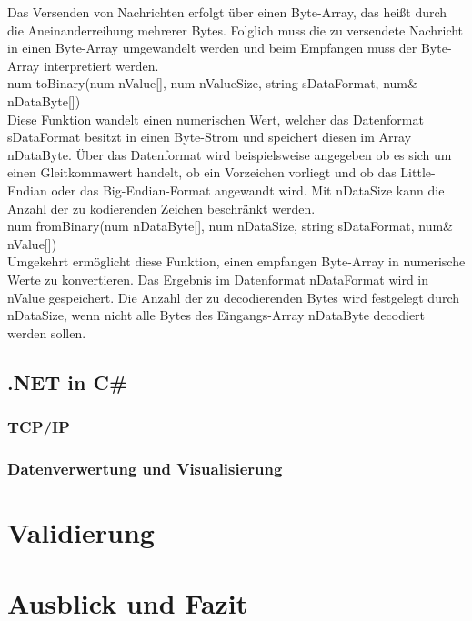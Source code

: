 \documentclass[ a4paper,
                oneside,
                toc=bibliography,
                toc=listof
                ]{scrbook}
\begin{document}
	Das Versenden von Nachrichten erfolgt über einen Byte-Array, das heißt durch die Aneinanderreihung mehrerer Bytes. Folglich muss die zu versendete Nachricht in einen Byte-Array umgewandelt werden und beim Empfangen muss der Byte-Array interpretiert werden.\\
	num toBinary(num nValue[], num nValueSize, string sDataFormat, num\& nDataByte[])\\
	Diese Funktion wandelt einen numerischen Wert, welcher das Datenformat sDataFormat besitzt in einen Byte-Strom und speichert diesen im Array nDataByte. Über das Datenformat wird beispielsweise angegeben ob es sich um einen Gleitkommawert handelt, ob ein Vorzeichen vorliegt und ob das Little-Endian oder das Big-Endian-Format angewandt wird. Mit nDataSize kann die Anzahl der zu kodierenden Zeichen beschränkt werden.\\
	num fromBinary(num nDataByte[], num nDataSize, string sDataFormat, num\& nValue[])\\
	Umgekehrt ermöglicht diese Funktion, einen empfangen Byte-Array in numerische Werte zu konvertieren. Das Ergebnis im Datenformat nDataFormat wird in nValue gespeichert. Die Anzahl der zu decodierenden Bytes wird festgelegt durch nDataSize, wenn nicht alle Bytes des Eingangs-Array nDataByte decodiert werden sollen.
	
	\section{.NET in C\#}
	
	
	\subsection{TCP/IP}
	
   	\subsection{Datenverwertung und Visualisierung}
   	
   	\chapter{Validierung}
   	
   	\chapter{Ausblick und Fazit}
   	
   	\backmatter
   	
   	
   	\cleardoublepage
   	\listoffigures
   	\cleardoublepage
   	\listoftables
   	\cleardoublepage
   	
   	\cleardoublepage
   	\printbibliography
   	
   
\end{document}
